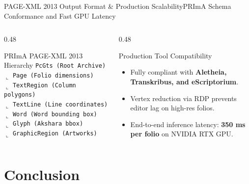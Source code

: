 \documentclass[aspectratio=169]{beamer}
\begin{document}
\begin{frame}{PAGE-XML 2013 Output Format \& Production Scalability}{PRImA Schema Conformance and Fast GPU Latency}
\begin{columns}
  \begin{column}{0.48\textwidth}
    \begin{block}{PRImA PAGE-XML 2013 Hierarchy}
      \texttt{PcGts (Root Archive)}\\
      \quad $\llcorner$ \texttt{Page (Folio dimensions)}\\
      \qquad $\llcorner$ \texttt{TextRegion (Column polygons)}\\
      \qquad\quad $\llcorner$ \texttt{TextLine (Line coordinates)}\\
      \qquad\qquad $\llcorner$ \texttt{Word (Word bounding box)}\\
      \qquad\qquad\quad $\llcorner$ \texttt{Glyph (Akshara bbox)}\\
      \qquad $\llcorner$ \texttt{GraphicRegion (Artworks)}
    \end{block}
  \end{column}
  \begin{column}{0.48\textwidth}
    \begin{block}{Production Tool Compatibility}
      \begin{itemize}
        \item Fully compliant with \textbf{Aletheia, Transkribus, and eScriptorium}.
        \item Vertex reduction via RDP prevents editor lag on high-res folios.
        \item End-to-end inference latency: \textbf{350 ms per folio} on NVIDIA RTX GPU.
      \end{itemize}
    \end{block}
  \end{column}
\end{columns}
\end{frame}

\section{Conclusion}
\end{document}
